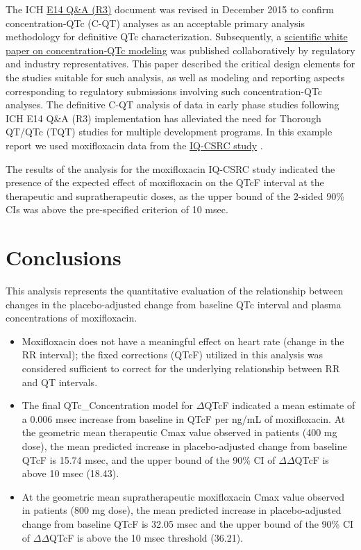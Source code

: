 \documentclass[
]{article}
\begin{document}
The ICH
\href{https://database.ich.org/sites/default/files/E14_Q\%26As_R3_Q\%26As.pdf}{E14
Q\&A (R3)} document was revised in December 2015 to confirm
concentration-QTc (C-QT) analyses as an acceptable primary analysis
methodology for definitive QTc characterization. Subsequently, a
\href{https://link-springer-com.eu1.proxy.openathens.net/content/pdf/10.1007/s10928-017-9558-5.pdf}{scientific
white paper on concentration-QTc modeling} was published collaboratively
by regulatory and industry representatives. This paper described the
critical design elements for the studies suitable for such analysis, as
well as modeling and reporting aspects corresponding to regulatory
submissions involving such concentration-QTc analyses. The definitive
C-QT analysis of data in early phase studies following ICH E14 Q\&A (R3)
implementation has alleviated the need for Thorough QT/QTc (TQT) studies
for multiple development programs. In this example report we used
moxifloxacin data from the
\href{https://pubmed.ncbi.nlm.nih.gov/25670536/}{IQ-CSRC study} .

The results of the analysis for the moxifloxacin IQ-CSRC study indicated
the presence of the expected effect of moxifloxacin on the QTcF interval
at the therapeutic and supratherapeutic doses, as the upper bound of the
2-sided 90\% CIs was above the pre-specified criterion of 10 msec.

\hypertarget{conclusions}{%
\section{Conclusions}\label{conclusions}}

This analysis represents the quantitative evaluation of the relationship
between changes in the placebo-adjusted change from baseline QTc
interval and plasma concentrations of moxifloxacin.

\begin{itemize}
\item
  Moxifloxacin does not have a meaningful effect on heart rate (change
  in the RR interval); the fixed corrections (QTcF) utilized in this
  analysis was considered sufficient to correct for the underlying
  relationship between RR and QT intervals.
\item
  The final QTc\_Concentration model for \(\Delta\)QTcF indicated a mean
  estimate of a 0.006 msec increase from baseline in QTcF per ng/mL of
  moxifloxacin. At the geometric mean therapeutic Cmax value observed in
  patients (400 mg dose), the mean predicted increase in
  placebo-adjusted change from baseline QTcF is 15.74 msec, and the
  upper bound of the 90\% CI of \(\Delta \Delta\)QTcF is above 10 msec
  (18.43).
\item
  At the geometric mean supratherapeutic moxifloxacin Cmax value
  observed in patients (800 mg dose), the mean predicted increase in
  placebo-adjusted change from baseline QTcF is 32.05 msec and the upper
  bound of the 90\% CI of \(\Delta \Delta\)QTcF is above the 10 msec
  threshold (36.21).
\end{itemize}

\clearpage

\renewcommand\refname{References}
  
\end{document}
